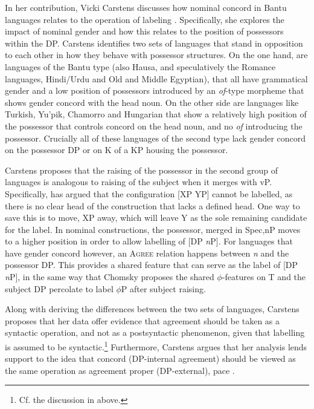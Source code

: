\documentclass[output=paper
,modfonts
,nonflat]{langsci/langscibook}
\begin{document}
In her contribution, Vicki Carstens discusses how nominal concord in Bantu languages relates to the operation of labeling \citep{Chomsky2013,Chomsky2015}.
Specifically, she explores the impact of nominal gender and how this relates to the position of possessors within the DP.
Carstens identifies two sets of languages that stand in opposition to each other in how they behave with possessor structures.
On the one hand, are languages of the Bantu type (also Hausa, and speculatively the Romance languages, Hindi/Urdu and Old and Middle Egyptian), that all have grammatical gender and a low position of possessors introduced by an \emph{of}-type morpheme that shows gender concord with the head noun.
On the other side are languages like Turkish, Yu'pik, Chamorro and Hungarian that show a relatively high position of the possessor that controls concord on the head noun, and no \emph{of} introducing the possessor.
Crucially all of these languages of the second type lack gender concord on the possessor DP or on K of a KP housing the possessor.

Carstens proposes that the raising of the possessor in the second group of languages is analogous to raising of the subject when it merges with vP.
Specifically, \citet{Chomsky2013} has argued that the configuration [XP YP] cannot be labelled, as there is no clear head of the construction that lacks a defined head.
One way to save this is to move, XP away, which will leave Y as the sole remaining candidate for the label.
In nominal constructions, the possessor, merged in Spec,nP moves to a higher position in order to allow labelling of [DP \emph{n}P].
For languages that have gender concord however, an \textsc{Agree} relation happens between \emph{n} and the possessor DP.
This provides a shared feature that can serve as the label of [DP \emph{n}P], in the same way that Chomsky proposes the shared $\phi$-features on T and the subject DP percolate to label $\phi$P after subject raising.

Along with deriving the differences between the two sets of languages, Carstens  proposes that her data offer evidence that agreement should be taken as a syntactic operation, and not as a postsyntactic phenomenon, given that labelling is assumed to be syntactic.\footnote{Cf. the discussion in  above.}
Furthermore, Carstens argues that her analysis lends support to the idea that concord (DP-internal agreement) should be viewed as the same operation as agreement proper (DP-external), pace \citet{Chomsky2001,Chung2013,Norris2014,Baier2015}.
\end{document}
